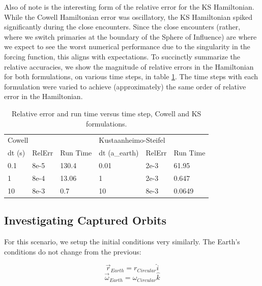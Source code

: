 \documentclass[11pt,twoside,letterpaper]{article}
\begin{document}
  Also of note is the interesting form of the relative error for the
  KS Hamiltonian. While the Cowell Hamiltonian error was oscillatory,
  the KS Hamiltonian spiked significantly during the close
  encounters. Since the close encounters (rather, where we switch
  primaries at the boundary of the Sphere of Influence) are where we
  expect to see the worst numerical performance due to the singularity
  in the forcing function, this aligns with expectations. To
  succinctly summarize the relative accuracies, we show the magnitude
  of relative errors in the Hamiltonian for both formulations, on
  various time steps, in table \ref{resultsTab}. The time steps with
  each formulation were varied to achieve (approximately) the same
  order of relative error in the Hamiltonian. 

  \begin{table}[] \label{resultsTab}
    \centering
    \begin{tabular}{llllll}
      \multicolumn{3}{l}{Cowell} & \multicolumn{3}{l}{Kustaanheimo-Steifel} \\
      dt (s) & RelErr & Run Time & dt (a\_earth) & RelErr & Run Time \\ \hline
      \multicolumn{1}{|l|}{0.1} & \multicolumn{1}{l|}{8e-5} & \multicolumn{1}{l|}{130.4} & \multicolumn{1}{l|}{0.01} & \multicolumn{1}{l|}{2e-3} & \multicolumn{1}{l|}{61.95} \\ \hline
      \multicolumn{1}{|l|}{1} & \multicolumn{1}{l|}{8e-4} & \multicolumn{1}{l|}{13.06} & \multicolumn{1}{l|}{1} & \multicolumn{1}{l|}{2e-3} & \multicolumn{1}{l|}{0.647} \\ \hline
      \multicolumn{1}{|l|}{10} & \multicolumn{1}{l|}{8e-3} & \multicolumn{1}{l|}{0.7} & \multicolumn{1}{l|}{10} & \multicolumn{1}{l|}{8e-3} & \multicolumn{1}{l|}{0.0649} \\ \hline
    \end{tabular}
    \caption{Relative error and run time versus time step, Cowell and KS formulations.}
  \end{table}

  \subsection{Investigating Captured Orbits}
  For this scenario, we setup the initial conditions very
  similarly. The Earth's conditions do not change from the previous:

  \begin{equation} \label{ics}
    \vec{r}_{Earth} = r_{Circular}\hat{i}
  \end{equation}
  \begin{equation}
    \vec{\omega}_{Earth} = \omega_{Circular}\hat{k}
  \end{equation}
\end{document}
